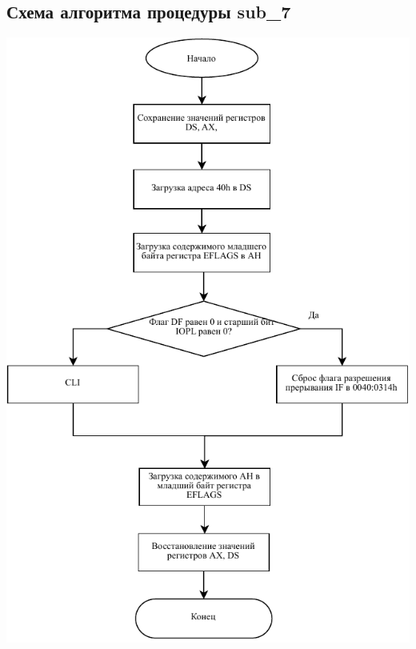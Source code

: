 \documentclass[a4paper,12pt]{article}
\begin{document}
\subsection{Схема алгоритма процедуры sub\_7}
    \includegraphics[height=0.95\textheight]{flowchart/5.pdf}
\begin{center}
\end{center}
\end{document}
